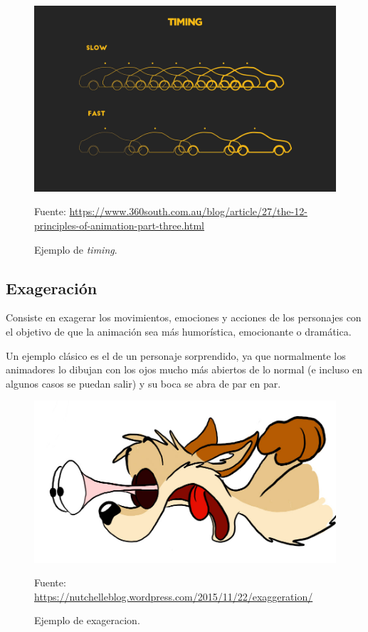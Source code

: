 \documentclass{article}
\begin{document}
\begin{figure}[H]
    \centering
    \includegraphics[width=\textwidth]{imagenes/image-9_timing.jpg}
    \caption{Ejemplo de \textit{timing}.}
    \vspace{10pt}
    \footnotesize{Fuente: \url{https://www.360south.com.au/blog/article/27/the-12-principles-of-animation-part-three.html}}
\end{figure}

\subsection{Exageración}

Consiste en exagerar los movimientos, emociones y acciones de los personajes con el objetivo de que la animación sea más humorística, emocionante o dramática.

\bigskip

Un ejemplo clásico es el de un personaje sorprendido, ya que normalmente los animadores lo dibujan con los ojos mucho más abiertos de lo normal (e incluso en algunos casos se puedan salir) y su boca se abra de par en par.

\begin{figure}[H]
    \centering
    \includegraphics[width=\textwidth]{imagenes/080104_eyes.jpg}
    \caption{Ejemplo de exageracion.}
    \vspace{10pt}
    \footnotesize{Fuente: \url{https://nutchelleblog.wordpress.com/2015/11/22/exaggeration/}}
\end{figure}
\end{document}
